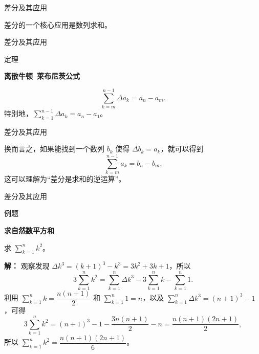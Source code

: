 \documentclass[aspectratio=169,10pt,fontset=fandol]{ctexbeamer}
\begin{document}
\begin{frame}[t,fragile]{差分及其应用}
\normalsize
{\normalsize
差分的一个核心应用是数列求和。


}
\end{frame}
\begin{frame}[t,fragile]{差分及其应用}
\normalsize
\begin{block}{定理}
{\normalsize
\textbf{离散牛顿--莱布尼茨公式}\par

\[
\sum _{k=m}^{n-1} \Delta a_k = a_n - a_m.
\]
特别地，\(\sum_{k=1}^{n-1} \Delta a_k = a_n - a_1\)。

}
\end{block}
\end{frame}
\begin{frame}[t,fragile]{差分及其应用}
\normalsize
{\normalsize
换而言之，如果能找到一个数列 \(b_k\) 使得 \(\Delta b_k=a_k\)，就可以得到
\[
\sum_{k=m}^{n-1}a_k=b_n-b_m.
\]
这可以理解为“差分是求和的逆运算”。


}
\end{frame}
\begin{frame}[t,fragile]{差分及其应用}
\normalsize
\begin{block}{例题}
{\normalsize
\textbf{求自然数平方和}\par

求 \(\sum_{k=1}^n k^2\)。

}
\end{block}
\pause
{\normalsize
\textbf{解：}
观察发现 \(\Delta k^3 = (k+1)^3 - k^3 = 3k^2 + 3k + 1\)，所以
\[
3\sum_{k=1}^n k^2 = \sum_{k=1}^n \Delta k^3 - 3\sum_{k=1}^n k - \sum_{k=1}^n 1.
\]
利用 \(\sum_{k=1}^n  k = \dfrac{n(n+1)}{2}\) 和 \(\sum_{k=1}^n  1 = n\)，以及 \(\sum_{k=1}^n  \Delta k^3 = (n+1)^3 - 1\)，可得
\[
3\sum_{k=1}^n  k^2 = (n+1)^3 - 1 - \dfrac{3n(n+1)}{2} - n = \dfrac{n(n+1)(2n+1)}{2},
\]
所以 \(\sum_{k=1}^n k^2 = \dfrac{n(n+1)(2n+1)}{6}\)。

}
\end{frame}
\end{document}

